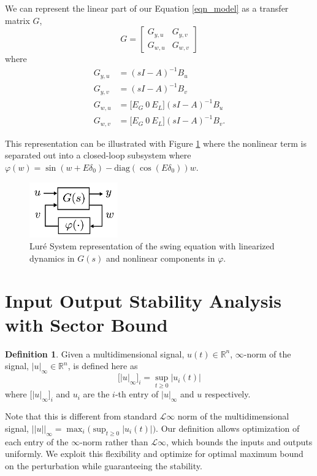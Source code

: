 \documentclass[journal]{IEEEtran}
\theoremstyle{definition}
\newtheorem{definition}{Definition}
\begin{document}
We can represent the linear part of our Equation \ref{eqn_model} as a transfer matrix $G$,
\begin{equation}
G=\begin{bmatrix} G_{y,u} & G_{y,v} \\ G_{w,u} & G_{w,v} \end{bmatrix}
\label{eqn_G}
\end{equation}
where
$$\begin{aligned} 
G_{y,u}&=(sI-A)^{-1}B_u\\
G_{y,v}&=(sI-A)^{-1}B_v\\
G_{w,u}&=\big[E_G \ 0 \ E_L\big](sI-A)^{-1}B_u\\
G_{w,v}&=\big[E_G \ 0 \ E_L\big](sI-A)^{-1}B_v.
\end{aligned}$$

This representation can be illustrated with Figure \ref{fig_system_w_uncertainty} where the nonlinear term is separated out into a closed-loop subsystem where $\varphi(w)=\sin(w+E\delta_0)-\text{diag}(\cos(E\delta_0))w$.

\begin{figure}[!htbp]
	\centering
	\includegraphics[width=1.5in]{picture/system_w_uncertainty.png}
	\caption{Lur\'e System representation of the swing equation with linearized dynamics in $G(s)$ and nonlinear components in $\varphi$.}
	\label{fig_system_w_uncertainty}
\end{figure}

\section{Input Output Stability Analysis with Sector Bound}

\begin{definition}
Given a multidimensional signal, $u(t)\in\mathbb{R}^n$, $\infty$-norm of the signal,  $|u|_\infty\in\mathbb{R}^n$, is defined here as
\begin{equation}
\big[|u|_\infty\big]_i=\sup_{t\geq0}|u_i(t)|
\end{equation}
where $\big[|u|_\infty\big]_i$ and $u_i$ are the $i$-th entry of $|u|_\infty$ and $u$ respectively.
\end{definition}

Note that this is different from standard $\mathcal{L}\infty$ norm of the multidimensional signal, $||u||_\infty=\max_i\big(\sup_{t\geq0}|u_i(t)|\big)$. Our definition allows optimization of each entry of the $\infty$-norm rather than $\mathcal{L}\infty$, which bounds the inputs and outputs uniformly. We exploit this flexibility and optimize for optimal maximum bound on the perturbation while guaranteeing the stability.
\end{document}
